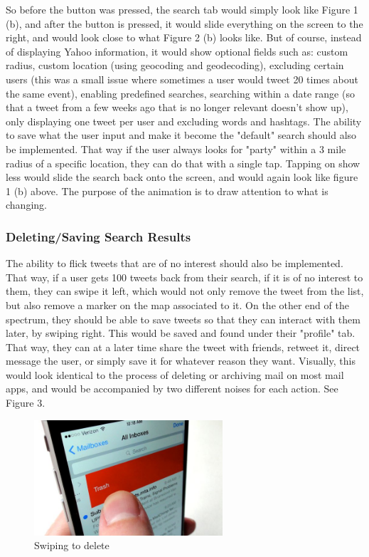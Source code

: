\documentclass[11pt]{article}
\begin{document}
So before the button was pressed, the search tab would simply look like Figure 1 (b), and after the button is pressed, it would slide everything on the screen to the right, and would look close to what Figure 2 (b) looks like. But of course, instead of displaying Yahoo information, it would show optional fields such as: custom radius, custom location (using geocoding and geodecoding), excluding certain users (this was a small issue where sometimes a user would tweet 20 times about the same event), enabling predefined searches, searching within a date range (so that a tweet from a few weeks ago that is no longer relevant doesn't show up), only displaying one tweet per user and excluding words and hashtags. The ability to save what the user input and make it become the "default" search should also be implemented. That way if the user always looks for "party" within a 3 mile radius of a specific location, they can do that with a single tap. Tapping on show less would slide the search back onto the screen, and would again look like figure 1 (b) above. The purpose of the animation is to draw attention to what is changing. 

\subsubsection{Deleting/Saving Search Results}
The ability to flick tweets that are of no interest should also be implemented. That way, if a user gets 100 tweets back from their search, if it is of no interest to them, they can swipe it left, which would not only remove the tweet from the list, but also remove a marker on the map associated to it. On the other end of the spectrum, they should be able to save tweets so that they can interact with them later, by swiping right. This would be saved and found under their "profile" tab. That way, they can at a later time share the tweet with friends, retweet it, direct message the user, or simply save it for whatever reason they want. Visually, this would look identical to the process of deleting or archiving mail on most mail apps, and would be accompanied by two different noises for each action. See Figure 3.

\begin{figure}[H]
    \centering
    \includegraphics[width=7cm]{swipeDelete}
    \caption{Swiping to delete}
\end{figure}
\end{document}
